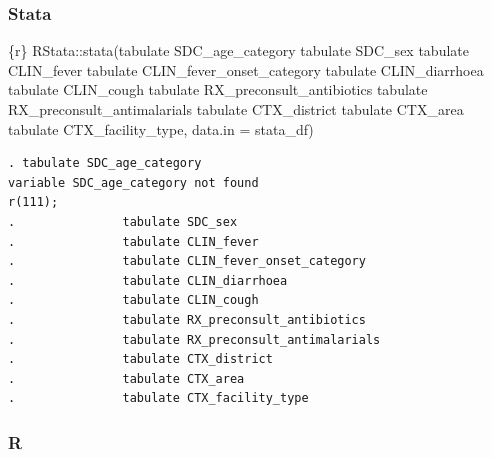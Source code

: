 \documentclass[
  letterpaper,
  DIV=11,
  numbers=noendperiod,
  oneside]{scrreprt}
\newenvironment{Shaded}{\begin{snugshade}}{\end{snugshade}}
\newcommand{\AttributeTok}[1]{\textcolor[rgb]{0.40,0.45,0.13}{#1}}
\newcommand{\FunctionTok}[1]{\textcolor[rgb]{0.28,0.35,0.67}{#1}}
\newcommand{\InformationTok}[1]{\textcolor[rgb]{0.37,0.37,0.37}{#1}}
\newcommand{\NormalTok}[1]{\textcolor[rgb]{0.00,0.23,0.31}{#1}}
\newcommand{\SpecialCharTok}[1]{\textcolor[rgb]{0.37,0.37,0.37}{#1}}
\newcommand{\StringTok}[1]{\textcolor[rgb]{0.13,0.47,0.30}{#1}}
\begin{document}
\hypertarget{stata-7}{%
\subsubsection{Stata}\label{stata-7}}

\begin{Shaded}
\begin{Highlighting}[]
\InformationTok{\textasciigrave{}\textasciigrave{}\textasciigrave{}\{r\}}
\NormalTok{RStata}\SpecialCharTok{::}\FunctionTok{stata}\NormalTok{(}\StringTok{\textquotesingle{}tabulate SDC\_age\_category}
\StringTok{              tabulate SDC\_sex}
\StringTok{              tabulate CLIN\_fever}
\StringTok{              tabulate CLIN\_fever\_onset\_category}
\StringTok{              tabulate CLIN\_diarrhoea}
\StringTok{              tabulate CLIN\_cough}
\StringTok{              tabulate RX\_preconsult\_antibiotics}
\StringTok{              tabulate RX\_preconsult\_antimalarials}
\StringTok{              tabulate CTX\_district}
\StringTok{              tabulate CTX\_area}
\StringTok{              tabulate CTX\_facility\_type\textquotesingle{}}\NormalTok{,}
              \AttributeTok{data.in =}\NormalTok{ stata\_df)}
\InformationTok{\textasciigrave{}\textasciigrave{}\textasciigrave{}}
\end{Highlighting}
\end{Shaded}

\begin{verbatim}
. tabulate SDC_age_category
variable SDC_age_category not found
r(111);
.               tabulate SDC_sex
.               tabulate CLIN_fever
.               tabulate CLIN_fever_onset_category
.               tabulate CLIN_diarrhoea
.               tabulate CLIN_cough
.               tabulate RX_preconsult_antibiotics
.               tabulate RX_preconsult_antimalarials
.               tabulate CTX_district
.               tabulate CTX_area
.               tabulate CTX_facility_type
\end{verbatim}

\hypertarget{r-7}{%
\subsubsection{R}\label{r-7}}
\end{document}
